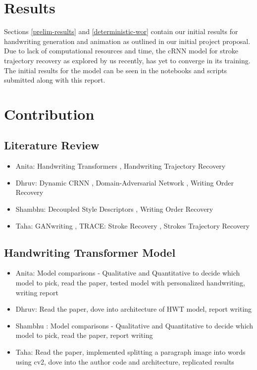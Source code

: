 \documentclass[10pt,twocolumn,letterpaper]{article}
\begin{document}
\section{Results}
Sections \ref{prelim-results} and \ref{deterministic-wor} contain our initial results for handwriting generation and animation as outlined in our initial project proposal. Due to lack of computational resources and time, the cRNN model for stroke trajectory recovery as explored by us recently, has yet to converge in its training. The initial results for the model can be seen in the notebooks and scripts submitted along with this report.


\section{Contribution}
\subsection{Literature Review}
\begin{itemize}
    \item Anita: Handwriting Transformers \cite{HWT}, Handwriting Trajectory Recovery \cite{image2stroke-1Char}
    \item Dhruv: Dynamic CRNN \cite{crnn}, Domain-Adversarial Network \cite{DANN}, Writing Order Recovery \cite{WOR}
    \item Shambhu: Decoupled Style Descriptors \cite{BRUSH-paper}, Writing Order Recovery \cite{WOR}
    \item Taha: GANwriting \cite{GAN-2}, TRACE: Stroke Recovery \cite{image2stroke-Archibald}, Strokes Trajectory Recovery \cite{img2stroke-multichar}
\end{itemize}
\subsection{Handwriting Transformer Model}
\begin{itemize}
    \item Anita: Model comparisons - Qualitative and Quantitative to decide which model to pick, read the paper\cite{HWT},  tested model with personalized handwriting, writing report
    \item Dhruv: Read the paper\cite{HWT}, dove into architecture of HWT model, report writing
    \item Shambhu : Model comparisons - Qualitative and Quantitative to decide which model to pick, read the paper\cite{HWT}, report writing
    \item Taha: Read the paper\cite{HWT}, implemented splitting a paragraph image into words using cv2, dove into the author code and architecture, replicated results
\end{itemize}
\end{document}
